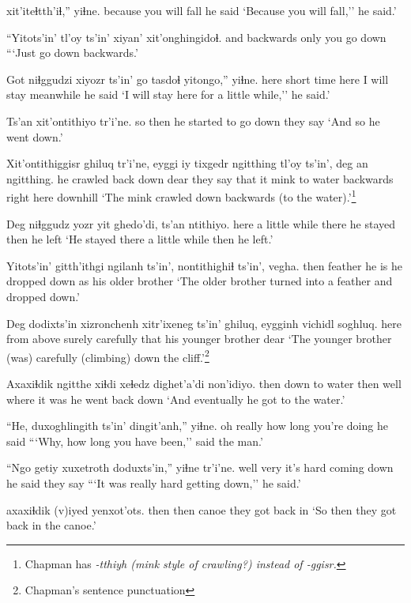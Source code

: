 \documentclass[12pt]{article}
\begin{document}
 xit'iteɬtth'iɬ,'' yiɬne.
because {you will fall} {he said}
\glt `Because you will fall,'' he said.'
\glend

\gll ``Yitots'in' {tl'oy ts'in'} xiyan' xit'onghingidoɬ.
and  backwards only  {you go down}
\glt ```Just go down backwards.'
\glend

\gll Got {niɬggudzi xiyozr ts'in'} go tasdoɬ  yitongo,'' yiɬne.
here {short time}  here {I will stay}  meanwhile {he said}
\glt `I will stay here for a little while,'' he said.'
\glend

\gll Ts'an  xit'ontithiyo tr'i'ne.
{so then}  {he started to go down} {they say}
\glt `And so he went down.'
\glend

\gll Xit'ontithiggisr  ghiluq tr'i'ne, eyggi iy tixgedr ngitthing {tl'oy ts'in',} {deg an} ngitthing.
{he crawled back down} dear { they say} that it mink  {to water} backwards {right here} downhill
\glt `The mink crawled down backwards (to the water).'\footnote{Chapman has \em -tthiyh \em (mink style of crawling?) instead of \em -ggisr.}
\glend

\gll Deg {niɬggudz yozr} yit ghedo'di, ts'an ntithiyo.
here {a little while} there {he stayed} then {he left}
\glt `He stayed there a little while then he left.'
\glend

\gll Yitots'in' gitth'ithgi ngilanh ts'in',  nontithighiɬ   ts'in', vegha.
then  feather {he is} {}  {he dropped down} as {his older brother}
\glt `The older brother turned into a feather and dropped down.'
\glend

\gll Deg dodixts'in xizronchenh {xitr'ixeneg ts'in'} ghiluq, eygginh vichidl  soghluq.
here {from above} surely carefully {} that  {his younger brother} dear
\glt `The younger brother (was) carefully (climbing) down the cliff.'\footnote{Chapman's sentence punctuation}
\glend

\gll Axaxiɬdik ngitthe  xiɬdi xeɬedz dighet'a'di non'idiyo.
then  {down to water} then well {where it was} {he went back down}
\glt `And eventually he got to the water.'
\glend

\gll ``He, {duxoghlingith ts'in'} dingit'anh,'' yiɬne.
{oh really}  {how long} {you're doing} {he said}
\glt ```Why, how long you have been,'' said the man.'
\glend

\gll ``Ngo getiy xuxetroth doduxts'in,'' yiɬne tr'i'ne.
well very {it's hard} {coming down} {he said} {they say}
\glt ```It was really hard getting down,'' he said.'
\glend

 axaxiɬdik (v)iyed yenxot'ots.
then  then canoe {they got back in}
\glt `So then they got back in the canoe.'
\glend
\end{document}
